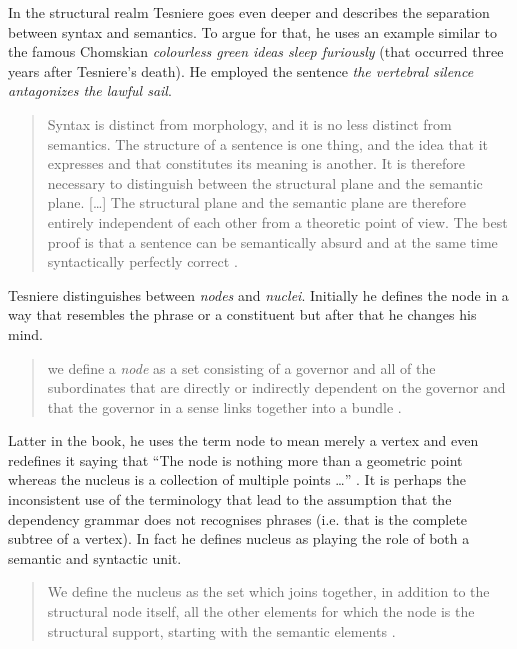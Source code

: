 In the structural realm Tesniere goes even deeper and describes the separation between syntax and semantics. To argue for that, he uses an example similar to the famous Chomskian \textit{colourless green ideas sleep furiously} \citep{Chomsky57} (that occurred three years after Tesniere's death). He employed the sentence \textit{the vertebral silence antagonizes the lawful sail}.

\begin{quotation}
    Syntax is distinct from morphology, and it is no less distinct from semantics. The structure of a sentence is one thing, and the idea that it expresses and that constitutes its meaning is another. It is therefore necessary to distinguish between the structural plane and the semantic plane.
    [\dots]
    The structural plane and the semantic plane are therefore entirely independent of each other from a theoretic point of view. The best proof is that a sentence can be ­semantically absurd and at the same time syntactically perfectly correct \citep[33]{Tesniere2015}.
\end{quotation}

Tesniere distinguishes between \textit{nodes} and \textit{nuclei}. Initially he defines the node in a way that resembles the phrase or a constituent but after that he changes his mind.  

\begin{quotation}
    we define a \textit{node} as a set consisting of a governor and all of the subordinates that are directly or indirectly dependent on the governor and that the governor in a sense links together into a bundle \citep[6]{Tesniere2015}.
\end{quotation}

Latter in the book, he uses the term node to mean merely a vertex and even redefines it saying that ``The node is nothing more than a geometric point whereas the nucleus is a collection of multiple points \dots'' \cite[39]{Tesniere2015}. It is perhaps the inconsistent use of the terminology that lead to the assumption that the dependency grammar does not recognises phrases (i.e. that is the complete subtree of a vertex). In fact he defines nucleus as playing the role of both a semantic and syntactic unit.

\begin{quotation}
    We define the nucleus as the set which joins together, in addition to the structural node itself, all the other elements for which the node is the structural support, starting with the semantic elements \citep[38]{Tesniere2015}.
\end{quotation}

